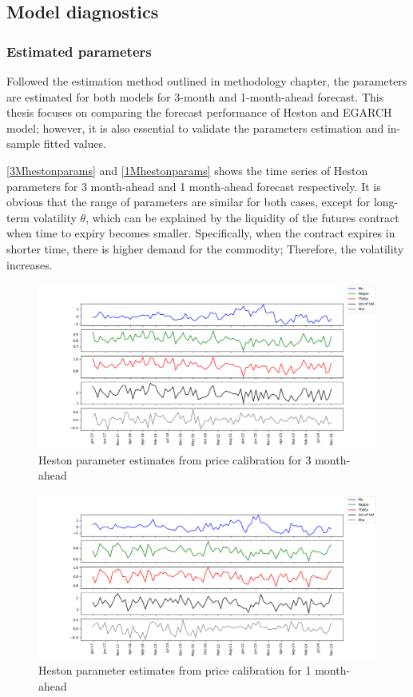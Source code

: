 \documentclass[12pt,a4paper]{article}
\newcommand\colorAutoref[1]{{\hypersetup{linkcolor=black}\autoref{#1}}}
\numberwithin{equation}{section}
\begin{document}
\subsection{Model diagnostics}

\subsubsection{Estimated parameters}

Followed the estimation method outlined in methodology chapter, the parameters are estimated for both models for 3-month and 1-month-ahead forecast. This thesis focuses on comparing the forecast performance of Heston and EGARCH model; however, it is also essential to validate the parameters estimation and in-sample fitted values.

 \colorAutoref{3Mhestonparams} and  \colorAutoref{1Mhestonparams} shows the time series of Heston parameters for 3 month-ahead and 1 month-ahead forecast respectively. It is obvious that the range of parameters are similar for both cases, except for long-term volatility $\theta$, which can be explained by the liquidity of the futures contract when time to expiry becomes smaller. Specifically, when the contract expires in shorter time, there is higher demand for the commodity; Therefore, the volatility increases. 


\begin{figure}[h!] 
\includegraphics[scale=1,width=1\linewidth,height=0.4\textheight]{heston_params_3m.png}
\caption{Heston parameter estimates from price calibration for 3 month-ahead}
\label{3Mhestonparams}
\end{figure}

\begin{figure}[h!] 
\includegraphics[scale=1,width=1\linewidth,height=0.4\textheight]{heston_params_1m.png}
\caption{Heston parameter estimates from price calibration for 1 month-ahead}
\label{1Mhestonparams}
\end{figure}
\end{document}
